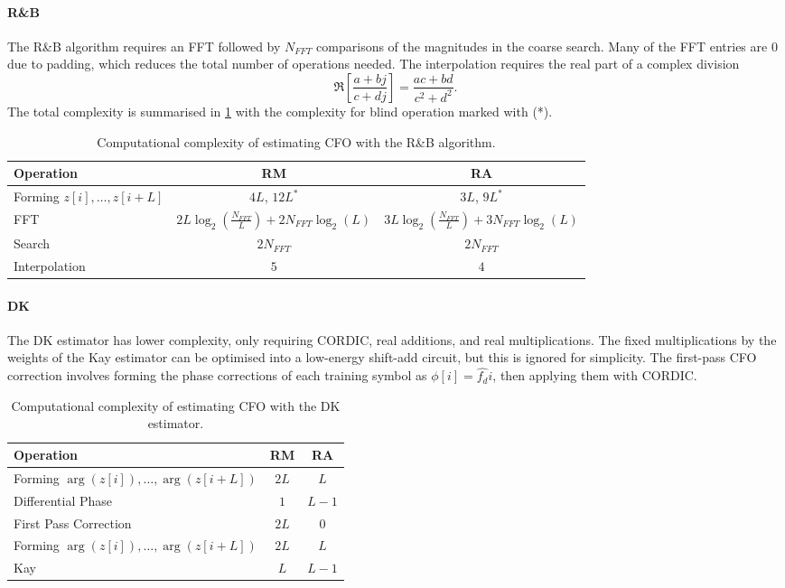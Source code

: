 \documentclass[12pt,a4paper]{article}
\begin{document}
\paragraph{R\&B}
The R\&B algorithm requires an FFT followed by \(N_{FFT}\) comparisons of the magnitudes in the coarse search. Many of the FFT entries are 0 due to padding, which reduces the total number of operations needed. The interpolation requires the real part of a complex division
\begin{equation}
\Re \left[\frac{a + bj}{c + dj}\right] = \frac{ac + bd}{c^2 + d^2}.
\end{equation}
The total complexity is summarised in \cref{tab:fft_cost} with the complexity for blind operation marked with (*).
\begin{table}[H]
    \centering
    \begin{tabular}{lcc}
        \toprule
        Operation & RM & RA \\
        \midrule
        Forming \(z[i], \dots, z[i+L]\) & \(4L\), \(12L^*\) & \(3L\), \(9L^*\)\\
        FFT & \(2L \log_2(\frac{N_{FFT}}{L}) + 2N_{FFT}\log_2(L)\) & \(3L \log_2(\frac{N_{FFT}}{L}) + 3N_{FFT}\log_2(L)\)\\
        Search & \(2N_{FFT}\) & \(2N_{FFT}\)\\
        Interpolation & \(5\) & \(4\) \\
        \bottomrule
    \end{tabular}
    \caption{Computational complexity of estimating CFO with the R\&B algorithm.}
    \label{tab:fft_cost}
\end{table}
\paragraph{DK}
The DK estimator has lower complexity, only requiring CORDIC, real additions, and real multiplications. The fixed multiplications by the weights of the Kay estimator can be optimised into a low-energy shift-add circuit, but this is ignored for simplicity. The first-pass CFO correction involves forming the phase corrections of each training symbol as \(\phi[i] = \hat{f_d}i\), then applying them with CORDIC.
\begin{table}[H]
    \centering
    \begin{tabular}{lcc}
        \toprule
        Operation & RM & RA \\
        \midrule
        Forming \(\arg(z[i]), \dots, \arg(z[i+L])\) & \(2L\) & \(L\)\\
        Differential Phase & \(1\) & \(L-1\)\\
        First Pass Correction & \(2L\) & \(0\)\\
        Forming \(\arg(z[i]), \dots, \arg(z[i+L])\) & \(2L\) & \(L\) \\
        Kay & \(L\) & \(L-1\) \\
        \bottomrule
    \end{tabular}
    \caption{Computational complexity of estimating CFO with the DK estimator.}
    \label{tab:diffkay_cost}
\end{table}
\end{document}
